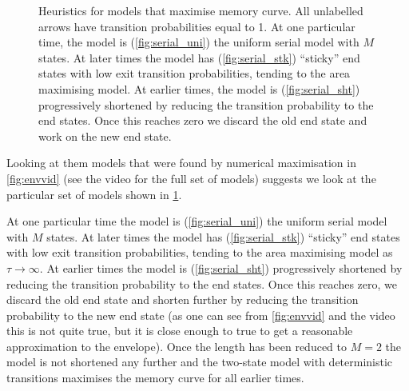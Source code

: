 \documentclass[12pt]{article}
\begin{document}
\begin{figure}[tb]
  \centering
  \begin{myenuma}
    \item{}\label{fig:serial_uni}
    \hspace{0.02\linewidth}
    \item{}\label{fig:serial_stk}
    \hspace{0.02\linewidth}
    \item{}\label{fig:serial_sht}
  \end{myenuma}
  \caption[Heuristic optimal models]{Heuristics for models that maximise memory curve.
  All unlabelled arrows have transition probabilities equal to 1.
  At one particular time, the model is (\ref{fig:serial_uni}) the uniform serial model with \(M\) states.
  At later times the model has (\ref{fig:serial_stk}) ``sticky'' end states with low exit transition probabilities, tending to the area maximising model.
  At earlier times, the model is (\ref{fig:serial_sht}) progressively shortened by reducing the transition probability to the end states.
  Once this reaches zero we discard the old end state and work on the new end state.
  } \label{fig:heuristicmodels}
\end{figure}


Looking at them models that were found by numerical maximisation in \cref{fig:envvid} 
(see the video for the full set of models) suggests we look at the particular set of models shown in \cref{fig:heuristicmodels}.

At one particular time the model is (\ref{fig:serial_uni}) the uniform serial model with \(M\) states.
At later times the model has (\ref{fig:serial_stk}) ``sticky'' end states with low exit transition probabilities, tending to the area maximising model as \(\tau \to \infty\).
At earlier times the model is (\ref{fig:serial_sht}) progressively shortened by reducing the transition probability to the end states.
Once this reaches zero, we discard the old end state and shorten further by reducing the transition probability to the new end state (as one can see from \cref{fig:envvid} and the video this is not quite true, but it is close enough to true to get a reasonable approximation to the envelope).
Once the length has been reduced to \(M=2\) the model is not shortened any further and the two-state model with deterministic transitions maximises the memory curve for all earlier times.
\end{document}
